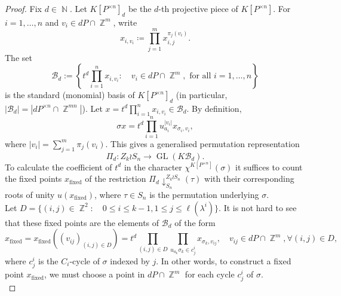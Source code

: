 \documentclass[10pt,a4paper]{amsart}
\DeclareMathOperator{\GL}{GL}
\DeclareMathOperator{\NN}{\mathbb{N}}
\DeclareMathOperator{\ZZ}{\mathbb{Z}}
\DeclareMathOperator{\fixed}{fixed}
\begin{document}
\begin{proof}
    Fix $d \in \NN$. Let $K[P^{\times n}]_d$ be the $d$-th projective piece of $K[P^{\times n}]$. For $i = 1, \ldots, n$ and $v_i \in dP \cap \ZZ^m$, write
    \[
    x_{i, v_i} \coloneq \prod_{j = 1}^m x_{i, j}^{\pi_j(v_i)}.
    \]
    The set
    \[
    \mathcal{B}_d := \left \{ t^d \prod_{i = 1}^n x_{i, v_i}: \quad v_i \in dP \cap \ZZ^m, \text{ for all } i = 1, \ldots, n \right \}
    \]
    is the standard (monomial) basis of $K[P^{\times n}]_d$ (in particular, $|\mathcal{B}_d| = |dP^{\times n} \cap \ZZ^{mn}|$). Let $x = t^d \prod_{i = 1}^n x_{i, v_i} \in \mathcal{B}_d$. By definition,
    \begin{equation}\label{eq:image-basis-element}
        \sigma x = t^d \prod_{i = 1}^n u_{a_i}^{|v_i|} x_{\sigma_i, v_i},
    \end{equation}
    where $|v_i| = \sum_{j = 1}^m \pi_j(v_i)$. This gives a generalised permutation representation 
    \[
    \Pi_d: Z_k \wr S_n \to \GL(K\mathcal{B}_d).
    \]
    To calculate the coefficient of $t^d$ in the character $\chi^{K[P^{\times n}]}(\sigma)$ it suffices to count the fixed points $x_{\fixed}$ of the restriction $\Pi_d \downarrow_{S_n}^{Z_k \wr S_n}(\tau)$ with their corresponding roots of unity $u(x_{\fixed})$, where $\tau \in S_n$ is the permutation underlying $\sigma$. \\
    
    Let $D = \{(i, j) \in \ZZ^2: \quad 0 \leq i \leq k - 1, 1 \leq j \leq \ell(\lambda^i)\}$. It is not hard to see that these fixed points are the elements of $\mathcal{B}_d$ of the form
    \[
    x_{\fixed} = x_{\fixed}\left ((v_{ij})_{(i, j) \in D}\right ) = t^d \prod_{(i, j) \in D}\prod_{u_{a_k}\sigma_k \in c_j^i} x_{\sigma_{k}, v_{ij}}, \quad v_{ij} \in dP \cap \ZZ^m, \forall (i, j) \in D,
    \]
    where $c_j^i$ is the $C_i$-cycle of $\sigma$ indexed by $j$. In other words, to construct a fixed point $x_{\fixed}$, we must choose a point in $dP \cap \ZZ^m$ for each cycle $c_j^i$ of $\sigma$. \\
    

\end{proof}
\end{document}
